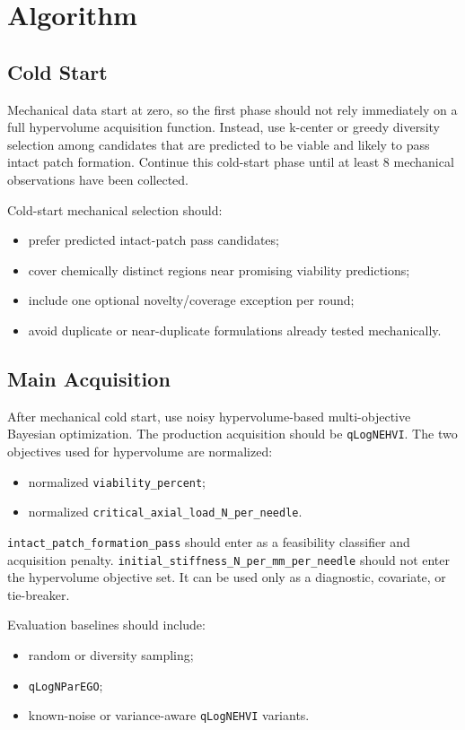\documentclass[11pt]{article}
\newcommand{\code}[1]{\texttt{#1}}
\newcommand{\metric}[1]{\texttt{#1}}
\begin{document}
\section{Algorithm}

\subsection{Cold Start}

Mechanical data start at zero, so the first phase should not rely immediately on a full
hypervolume acquisition function. Instead, use k-center or greedy diversity selection
among candidates that are predicted to be viable and likely to pass intact patch
formation. Continue this cold-start phase until at least 8 mechanical observations have
been collected.

Cold-start mechanical selection should:
\begin{itemize}
    \item prefer predicted intact-patch pass candidates;
    \item cover chemically distinct regions near promising viability predictions;
    \item include one optional novelty/coverage exception per round;
    \item avoid duplicate or near-duplicate formulations already tested mechanically.
\end{itemize}

\subsection{Main Acquisition}

After mechanical cold start, use noisy hypervolume-based multi-objective Bayesian
optimization. The production acquisition should be \code{qLogNEHVI}. The two objectives
used for hypervolume are normalized:
\begin{itemize}
    \item normalized \metric{viability\_percent};
    \item normalized \metric{critical\_axial\_load\_N\_per\_needle}.
\end{itemize}

\metric{intact\_patch\_formation\_pass} should enter as a feasibility classifier and
acquisition penalty. \metric{initial\_stiffness\_N\_per\_mm\_per\_needle} should not
enter the hypervolume objective set. It can be used only as a diagnostic, covariate, or
tie-breaker.

Evaluation baselines should include:
\begin{itemize}
    \item random or diversity sampling;
    \item \code{qLogNParEGO};
    \item known-noise or variance-aware \code{qLogNEHVI} variants.
\end{itemize}
\end{document}
